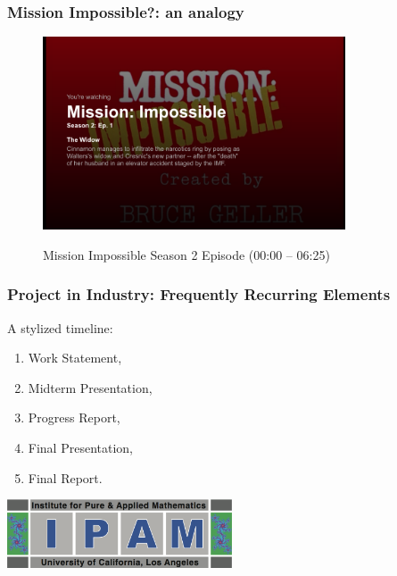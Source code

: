 \begin{frame}[fragile]
    \frametitle{Mission Impossible?: an analogy}
    \begin{figure}
        \caption{Mission Impossible Season 2 Episode (00:00 -- 06:25)}
    \begin{center}
    \href{http://movies.netflix.com/WiPlayer?movieid=70157337&trkid=4431095&pt_request_id=a8a7108c-c068-4d22-b649-0b7095279045-1882594&pt_rank=4&pt_row=-1&pt_location=WATCHNOW#MovieId=70157337&EpisodeMovieId=70156671}{
            \includegraphics[width=0.8\textwidth]{images/IMFproblemstatement.png}
    }
    \end{center}
    \end{figure}
\end{frame}

\begin{frame}
    \frametitle{Project in Industry: Frequently Recurring Elements}
    A stylized timeline:
    \vspace{7pt}
             \begin{enumerate}
                 \item Work Statement,
                 \item Midterm Presentation,
                 \item Progress Report,
                 \item Final Presentation,
                 \item Final Report.
             \end{enumerate}
    \begin{center}
        \href{http://www.ipam.ucla.edu/programs/rips2011/}{
        \includegraphics[width=0.5\textwidth]{images/ipam}}        
    \end{center}
\end{frame}

